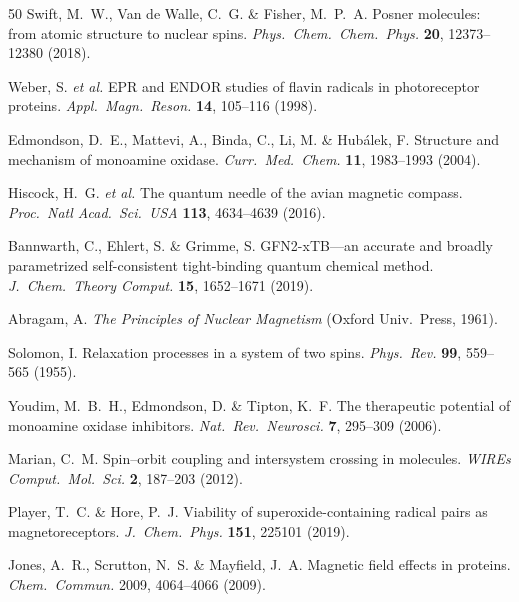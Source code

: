 \documentclass[11pt]{article}
\begin{document}
\begin{thebibliography}{50}
\label{ref:Swift2018} Swift, M.~W., Van de Walle, C.~G. \& Fisher, M.~P.~A. Posner molecules: from atomic structure to nuclear spins. \textit{Phys.\ Chem.\ Chem.\ Phys.} \textbf{20}, 12373--12380 (2018).

\label{ref:Weber1998} Weber, S. \textit{et al.} EPR and ENDOR studies of flavin radicals in photoreceptor proteins. \textit{Appl.\ Magn.\ Reson.} \textbf{14}, 105--116 (1998).

\label{ref:Edmondson2004main} Edmondson, D.~E., Mattevi, A., Binda, C., Li, M. \& Hub\'{a}lek, F. Structure and mechanism of monoamine oxidase. \textit{Curr.\ Med.\ Chem.} \textbf{11}, 1983--1993 (2004).

\label{ref:Hiscock2016} Hiscock, H.~G. \textit{et al.} The quantum needle of the avian magnetic compass. \textit{Proc.\ Natl Acad.\ Sci.\ USA} \textbf{113}, 4634--4639 (2016).

\label{ref:Bannwarth2019} Bannwarth, C., Ehlert, S. \& Grimme, S. GFN2-xTB---an accurate and broadly parametrized self-consistent tight-binding quantum chemical method. \textit{J.\ Chem.\ Theory Comput.} \textbf{15}, 1652--1671 (2019).

\label{ref:Abragam1961} Abragam, A. \textit{The Principles of Nuclear Magnetism} (Oxford Univ.\ Press, 1961).

\label{ref:Solomon1955} Solomon, I. Relaxation processes in a system of two spins. \textit{Phys.\ Rev.} \textbf{99}, 559--565 (1955).

\label{ref:Youdim2006} Youdim, M.~B.~H., Edmondson, D. \& Tipton, K.~F. The therapeutic potential of monoamine oxidase inhibitors. \textit{Nat.\ Rev.\ Neurosci.} \textbf{7}, 295--309 (2006).


\label{ref:Marian2012} Marian, C.~M. Spin--orbit coupling and intersystem crossing in molecules. \textit{WIREs Comput.\ Mol.\ Sci.} \textbf{2}, 187--203 (2012).

\label{ref:Player2019} Player, T.~C. \& Hore, P.~J. Viability of superoxide-containing radical pairs as magnetoreceptors. \textit{J.\ Chem.\ Phys.} \textbf{151}, 225101 (2019).

\label{ref:Jones2009} Jones, A.~R., Scrutton, N.~S. \& Mayfield, J.~A. Magnetic field effects in proteins. \textit{Chem.\ Commun.} 2009, 4064--4066 (2009).


\end{thebibliography}
\end{document}
